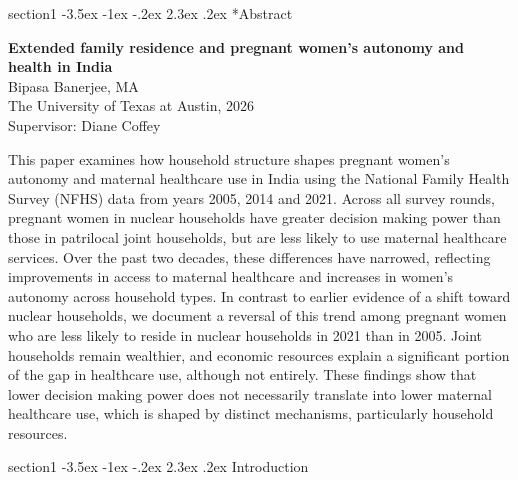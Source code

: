 \documentclass[12pt]{article}
\makeatletter
\renewcommand\section{\@startsection
{section}{1}{\z@}
{-3.5ex \@plus -1ex \@minus -.2ex}
{2.3ex \@plus.2ex}
{\centering\normalfont\Large\bfseries}}
\makeatother
\begin{document}
\clearpage
\thispagestyle{plain}

\section*{Abstract}

\vspace{2em}

\begin{center}
\textbf{Extended family residence and pregnant women’s autonomy and health in India} \\
\vspace{1em}
Bipasa Banerjee, MA \\
The University of Texas at Austin, 2026 \\
Supervisor: Diane Coffey
\end{center}

\vspace{2em}

\noindent
This paper examines how household structure shapes pregnant women's autonomy and maternal healthcare use in India using the National Family Health Survey (NFHS) data from years 2005, 2014 and 2021. Across all survey rounds, pregnant women in nuclear households have greater decision making power than those in patrilocal joint households, but are less likely to use maternal healthcare services. Over the past two decades, these differences have narrowed, reflecting improvements in access to maternal healthcare and increases in women's autonomy across household types. In contrast to earlier evidence of a shift toward nuclear households, we document a reversal of this trend among pregnant women who are less likely to reside in nuclear households in 2021 than in 2005. Joint households remain wealthier, and economic resources explain a significant portion of the gap in healthcare use, although not entirely. These findings show that lower decision making power does not necessarily translate into lower maternal healthcare use, which is shaped by distinct mechanisms, particularly household resources. 

\clearpage

\clearpage
\renewcommand{\contentsname}{Contents}
\tableofcontents
\clearpage







\section{Introduction}
\end{document}
